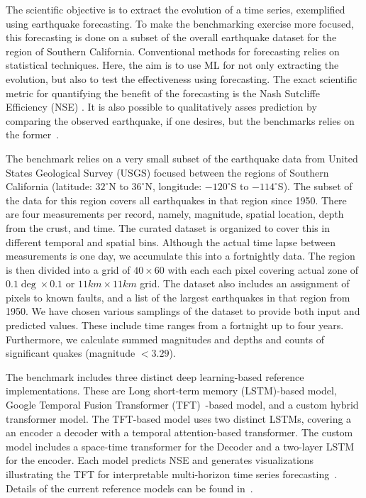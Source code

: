  The scientific objective is to extract the evolution of a time series, exemplified using earthquake forecasting. To make the benchmarking exercise more focused, this forecasting is done on a subset of the overall earthquake dataset for the region of  Southern California. Conventional methods for forecasting relies on statistical techniques. Here, the aim is to use ML for not only extracting the evolution, but also to test the effectiveness using forecasting. The exact scientific metric for quantifying the benefit of the forecasting is the Nash Sutcliffe Efficiency (NSE) \cite{nash-79}. It is also possible to qualitatively asses prediction by comparing the observed earthquake, if one desires, but the benchmarks relies on the former~\cite{fox2022-jm}.

\smallskip 

 The benchmark relies on a very small subset of the earthquake data from United States Geological Survey (USGS) focused between the regions of Southern California (latitude: $32^\circ$N to $36^\circ$N, longitude: $-120^\circ$S to $-114^\circ$S). The subset of the data for this region covers all earthquakes in that region since 1950. There are four measurements per record, namely,  magnitude, spatial location, depth from the crust, and time. The curated dataset is organized to cover this in different temporal and spatial bins. Although the actual time lapse between measurements is one day, we accumulate this into a fortnightly data. The region is then divided into a grid of  $40\times 60$ with each each pixel covering actual zone of $0.1\deg\times 0.1$ or $11km\times 11km$ grid. The dataset also includes an assignment of pixels to known faults, and a list of the largest earthquakes in that region from 1950. We have chosen various samplings of the dataset to provide both
input and predicted values. These include time ranges from a fortnight
up to four years. Furthermore, we calculate summed magnitudes and depths and
counts of significant quakes (magnitude $< 3.29$). 

\smallskip 

 The benchmark includes three distinct deep learning-based reference implementations. These are Long short-term memory (LSTM)-based model, Google Temporal Fusion Transformer (TFT)~\cite{TFT-21}-based model, and a custom hybrid transformer model. The TFT-based model uses  two distinct LSTMs, covering a an encoder a decoder with a temporal attention-based transformer. The custom model includes a space-time transformer for the Decoder and a two-layer LSTM for the encoder. Each model predicts NSE and generates visualizations illustrating the TFT for interpretable multi-horizon time series forecasting~\cite{TFT-21}. Details of the current reference models can be found in~\cite{fox2022-jm}.

